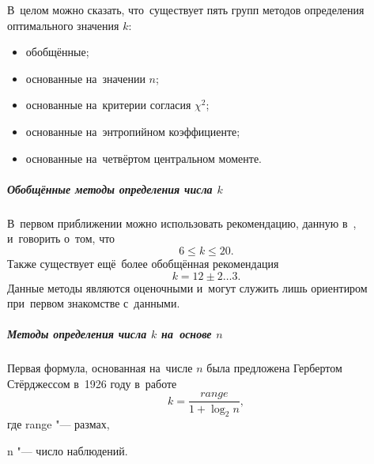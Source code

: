 \documentclass[]{scrartcl}
\begin{document}
В~целом можно сказать, что~существует пять групп методов определения оптимального значения $k$:
	\begin{itemize}
		\item обобщённые;
		\item основанные на~значении $n$;
		\item основанные на~критерии согласия $\chi^{2}$;
		\item основанные на~энтропийном коэффициенте;
		\item основанные на~четвёртом центральном моменте.
	\end{itemize}
\subparagraph{Обобщённые методы определения числа $k$}\label{k-hist:common-methods}
\par
В~первом приближении можно использовать рекомендацию, данную в~\cite{Shtorm:MathStat}, и~говорить о~том, что
\begin{equation}\label{n-k-Nowiczkij-1}
6 \leq k \leq 20.
\end{equation}
Также существует ещё~более обобщённая рекомендация
\begin{equation}\label{n-k-Nowiczkij-2}
k = 12 \pm 2 \ldots 3.
\end{equation}
Данные методы являются оценочными и~могут служить лишь ориентиром при~первом знакомстве с~данными.
\subparagraph{Методы определения числа $k$ на~основе $n$}\label{k-hist:n-methods}
\par
Первая формула, основанная на~числе $n$ была предложена Гербертом Стёрджессом в~1926 году в~работе~\cite{Sturgess:hist-intervals}
\begin{equation}\label{eq:hist_Sturgess-1}
k = \frac{range}{1 + \log_2 n},
\end{equation}
где \foreignlanguage{english}{range} "--- размах,

n "--- число наблюдений.
\end{document}
